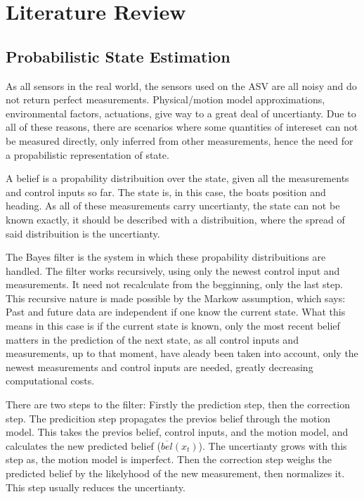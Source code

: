 \chapter{Literature Review}
\label{chap:literature-review}

\section{Probabilistic State Estimation}
\label{sec:literature-review-probabilistic-state-estimation}

As all sensors in the real world, the sensors used on the ASV are all noisy and do not return perfect measurements.
Physical/motion model approximations, environmental factors, actuations, give way to a great deal of uncertianty\citep[ch.~1]{thrun2005probabilistic}.
Due to all of these reasons, there are scenarios where some quantities of intereset can not be measured directly, only inferred from other measurements,
hence the need for a propabilistic representation of state\citep[ch.~2]{thrun2005probabilistic}.

A belief is a propability distribuition over the state, given all the measurements
and control inputs so far. The state is, in this case, the boats position and heading\citep[ch.~2]{thrun2005probabilistic}.
As all of these measurements carry uncertianty, the state can not be known exactly,
it should be described with a distribuition, where the spread of said distribuition
is the uncertianty.

The Bayes filter is the system in which these propability distribuitions are handled.
The filter works recursively, using only the newest control input and measurements.
It need not recalculate from the begginning, only the last step.
This recursive nature is made possible by the Markow assumption, which says:
Past and future data are independent if one know the current state.
What this means in this case is if the current state is known,
only the most recent belief matters in the prediction of the next state, as all control inputs and measurements, up to that moment,
have aleady been taken into account, only the newest measurements and control inputs are needed,
greatly decreasing computational costs\citep[ch.~2]{thrun2005probabilistic}.

There are two steps to the filter: Firstly the prediction step, then the correction step.
The predicition step propagates the previos belief through the motion model.
This takes the previos belief, control inputs, and the motion model, and calculates
the new predicted belief ($\overline{bel}(x_t)$).
The uncertianty grows with this step as, the motion model is imperfect.
Then the correction step weighs the predicted belief by the likelyhood of the
new measurement, then normalizes it. This step usually reduces the uncertianty\citep[ch.~2]{thrun2005probabilistic}.

